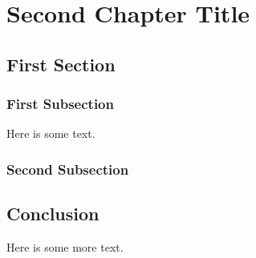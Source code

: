 \chapter{Second Chapter Title}
\chaptoc %

\section{First Section}
\subsection{First Subsection}
Here is some text. 

\subsection{Second Subsection}

\section{Conclusion}
Here is some more text. 
